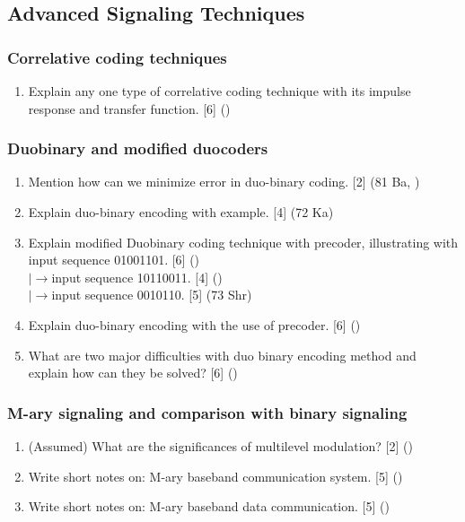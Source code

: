 \documentclass[12pt]{article}
\newcommand{\lb}{\\$\left|\rightarrow\right.$}
\begin{document}
  \subsection{Advanced Signaling Techniques}
    \subsubsection{Correlative coding techniques}
    	\begin{enumerate}
    		\item Explain any one type of correlative coding technique with its impulse response and transfer function. \hfill [6] ()
    	\end{enumerate}
    
    \subsubsection{Duobinary and modified duocoders}
    	\begin{enumerate}
    		\item Mention how can we minimize error in duo-binary coding. \hfill [2] (81 Ba, )
    		
    		\item Explain duo-binary encoding with example. \hfill [4] (72 Ka)
    		
    		\item Explain modified Duobinary coding technique with precoder, illustrating with input sequence 01001101. \hfill [6] ()
        	\lb input sequence 10110011. \hfill [4] ()
        	\lb input sequence 0010110. \hfill [5] (73 Shr)
        	
        	\item Explain duo-binary encoding with the use of precoder. \hfill [6] ()
        	
        	\item What are two major difficulties with duo binary encoding method and explain how can they be solved? \hfill [6] ()
    	\end{enumerate}
    
    \subsubsection{M-ary signaling and comparison with binary signaling}
      \begin{enumerate}
        \item (Assumed) What are the significances of multilevel modulation? \hfill [2] ()
        
        \item Write short notes on: M-ary baseband communication system. \hfill [5] ()
        
        \item Write short notes on: M-ary baseband data communication. \hfill [5] ()
      \end{enumerate}
\end{document}
